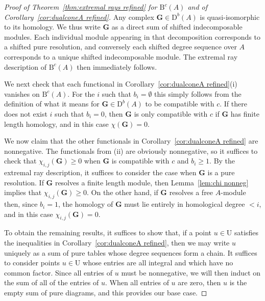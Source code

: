 \documentclass[12pt]{amsart}
\theoremstyle{definition}
\theoremstyle{remark}
\newcommand{\UU}{\mathrm{U}}
\newcommand{\bb}{c}
\newcommand{\Gbull}{\mathbf{G}}
\newcommand{\nothing}{\emptyset}
\newcommand{\DD}{\mathrm{D}}
\newcommand{\BBQ}{\mathrm{B}}
\begin{document}
\begin{proof}[Proof of Theorem~\ref{thm:extremal rays refined} for $\BBQ^{\bb}(A)$ and of Corollary~\ref{cor:dualconeA refined}]

Any complex $\Gbull\in \DD^b(A)$ is quasi-isomorphic to its homology.  We thus write $\Gbull$ as a direct sum of shifted indecomposable modules.  Each individual module appearing in that decomposition corresponds to a shifted pure resolution, and conversely each shifted degree sequence over $A$ corresponds to a unique shifted indecomposable module.  The extremal ray description of $\BBQ^{\bb}(A)$ then immediately follows.

We next check that each functional in Corollary~\ref{cor:dualconeA refined}(i) vanishes on $\BBQ^{\bb}(A)$.  For the $i$ such that $b_i=\nothing$ this simply follows from the definition of what it means for $\Gbull\in \DD^b(A)$ to be compatible with $\bb$.  If there does not exist $i$ such that $b_i=0$, then $\Gbull$ is only compatible with $\bb$ if $\Gbull$ has finite length homology, and in this case $\chi(\Gbull)=0$.  

We now claim that the other functionals in Corollary~\ref{cor:dualconeA refined} are nonnegative.  The functionals from (ii) are obviously nonnegative, so it suffices to check that $\chi_{i,j}(\Gbull)\geq 0$ when $\Gbull$ is compatible with $\bb$ and $b_i\geq 1$.  By the extremal ray description, it suffices to consider the case when $\Gbull$ is a pure resolution.  If $\Gbull$ resolves a finite length module, then Lemma~\ref{lem:chi nonneg} implies that $\chi_{i,j}(\Gbull)\geq 0$.  On the other hand, if $\Gbull$ resolves a free $A$-module then, since $b_i=1$, the homology of $\Gbull$ must lie entirely in homological degree $<i$, and in this case $\chi_{i,j}(\Gbull)=0$.

To obtain the remaining results, it suffices to show that, if a point $u\in \UU$ satisfies the inequalities in Corollary~\ref{cor:dualconeA refined}, then we may write $u$ uniquely as a sum of pure tables whose degree sequences form a chain.  It suffices to consider points $u\in \UU$ whose entries are all integral and which have no common factor.  Since all entries of $u$ must be nonnegative, we will then induct on the sum of all of the entries of $u$.  When all entries of $u$ are zero, then $u$ is the empty sum of pure diagrams, and this provides our base case.


\end{proof}
\end{document}
